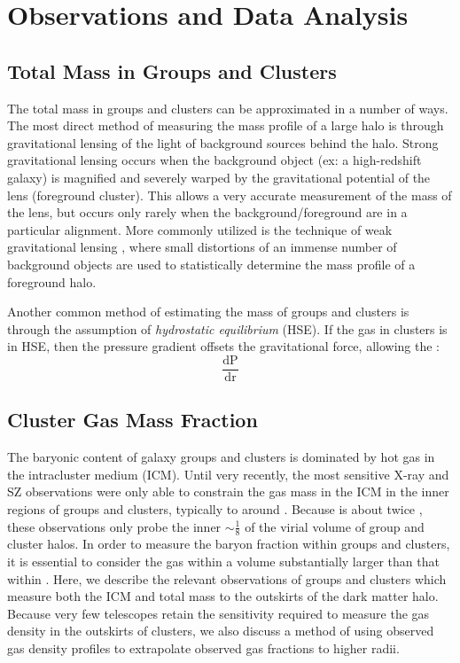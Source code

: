 \chapter{Observations and Data Analysis}
\label{chap:Data}

\section{Total Mass in Groups and Clusters}
\label{sec:Mass}

The total mass in groups and clusters can be approximated in a number
of ways. The most direct method of measuring the mass profile of a
large halo is through gravitational lensing of the light of background
sources behind the halo. Strong gravitational lensing occurs when the
background object (ex: a high-redshift galaxy) is magnified and
severely warped by the gravitational potential of the lens (foreground
cluster). This allows a very accurate measurement of the mass of the
lens, but occurs only rarely when the background/foreground are in a
particular alignment. More commonly utilized is the technique of weak
gravitational lensing
, where small
distortions of an immense number of background objects are used to
statistically determine the mass profile of a foreground halo.

Another common method of estimating the mass of groups and clusters is
through the assumption of \textit{hydrostatic equilibrium} (HSE). If
the gas in clusters is in HSE, then the pressure gradient offsets the
gravitational force, allowing the :
\begin{equation}
\frac{\textrm{dP}}{\textrm{dr}} 
\end{equation}

\section{Cluster Gas Mass Fraction}
\label{sec:Gas}
The baryonic content of galaxy groups and clusters is dominated by hot
gas in the intracluster medium (ICM). Until very recently, the most
sensitive X-ray and SZ observations were only able to constrain the
gas mass in the ICM in the inner regions of groups and clusters,
typically to around \rfive{} .  Because \rvir{} is about twice \rfive{},
these observations only probe the inner $\sim \frac{1}{8}$ of the
virial volume of group and cluster halos. In order to measure the
baryon fraction within groups and clusters, it is essential to
consider the gas within a volume substantially larger than that within
\rfive{}. Here, we describe the relevant observations of groups and
clusters which measure both the ICM and total mass to the outskirts of
the dark matter halo. Because very few telescopes retain the
sensitivity required to measure the gas density in the outskirts of
clusters, we also discuss a method of using observed gas density
profiles to extrapolate observed gas fractions to higher radii.

